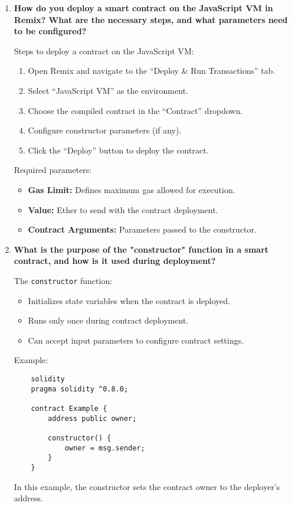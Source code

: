 \documentclass[11pt]{article}
\begin{document}
\begin{enumerate}
    \item \textbf{How do you deploy a smart contract on the JavaScript VM in Remix? What are the necessary steps, and what parameters need to be configured?}
    
    Steps to deploy a contract on the JavaScript VM:
    \begin{enumerate}
        \item Open Remix and navigate to the “Deploy \& Run Transactions” tab.
        \item Select “JavaScript VM” as the environment.
        \item Choose the compiled contract in the “Contract” dropdown.
        \item Configure constructor parameters (if any).
        \item Click the “Deploy” button to deploy the contract.
    \end{enumerate}
    
    Required parameters:
    \begin{itemize}
        \item \textbf{Gas Limit:} Defines maximum gas allowed for execution.
        \item \textbf{Value:} Ether to send with the contract deployment.
        \item \textbf{Contract Arguments:} Parameters passed to the constructor.
    \end{itemize}

    \item \textbf{What is the purpose of the "constructor" function in a smart contract, and how is it used during deployment?}
    
    The \texttt{constructor} function:
    \begin{itemize}
        \item Initializes state variables when the contract is deployed.
        \item Runs only once during contract deployment.
        \item Can accept input parameters to configure contract settings.
    \end{itemize}

    Example:
    \begin{verbatim}
    solidity
    pragma solidity ^0.8.0;
    
    contract Example {
        address public owner;

        constructor() {
            owner = msg.sender;
        }
    }
    \end{verbatim}
    In this example, the constructor sets the contract owner to the deployer’s address.


\end{enumerate}
\end{document}
